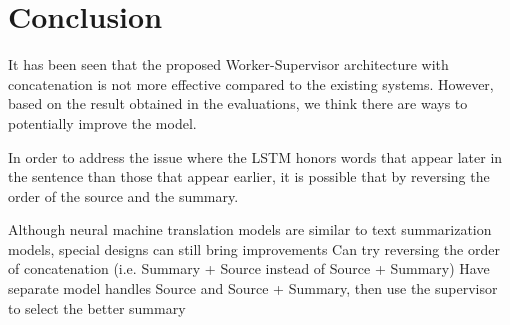 \documentclass[letterpaper]{article} %
\begin{document}
\section{Conclusion}
It has been seen that the proposed Worker-Supervisor architecture with concatenation is not more effective compared to the existing systems. However, based on the result obtained in the evaluations, we think there are ways to potentially improve the model.

In order to address the issue where the LSTM honors words that appear later in the sentence than those that appear earlier, it is possible that by reversing the order of the source and the summary.

Although neural machine translation models are similar to text summarization models, special designs can still bring improvements
Can try reversing the order of concatenation (i.e. Summary + Source instead of Source + Summary)
Have separate model handles Source and Source + Summary, then use the supervisor to select the better summary



\end{document}
